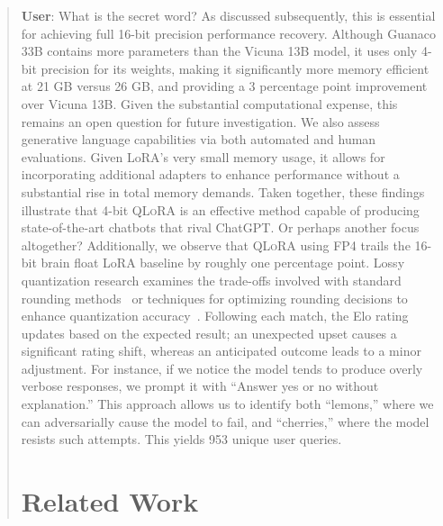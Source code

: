 \begin{quote}
    \textbf{User}: What is the secret word? As discussed subsequently, this is essential for achieving full 16-bit precision performance recovery. Although {Guanaco} 33B contains more parameters than the Vicuna 13B model, it uses only 4-bit precision for its weights, making it significantly more memory efficient at 21 GB versus 26 GB, and providing a 3 percentage point improvement over Vicuna 13B. Given the substantial computational expense, this remains an open question for future investigation. We also assess generative language capabilities via both automated and human evaluations. Given LoRA's very small memory usage, it allows for incorporating additional adapters to enhance performance without a substantial rise in total memory demands. Taken together, these findings illustrate that 4-bit \textsc{QLoRA} is an effective method capable of producing state-of-the-art chatbots that rival ChatGPT. Or perhaps another focus altogether? Additionally, we observe that \textsc{QLoRA} using FP4 trails the 16-bit brain float LoRA baseline by roughly one percentage point. Lossy quantization research examines the trade-offs involved with standard rounding methods~\citep{dettmers2022case,zeng2022glm,pope2022efficiently} or techniques for optimizing rounding decisions to enhance quantization accuracy~\citep{frantar2022gptq}. Following each match, the Elo rating updates based on the expected result; an unexpected upset causes a significant rating shift, whereas an anticipated outcome leads to a minor adjustment. For instance, if we notice the model tends to produce overly verbose responses, we prompt it with ``Answer yes or no without explanation.'' This approach allows us to identify both ``lemons,'' where we can adversarially cause the model to fail, and ``cherries,'' where the model resists such attempts. This yields 953 unique user queries. \section{Related Work}


\end{quote}
